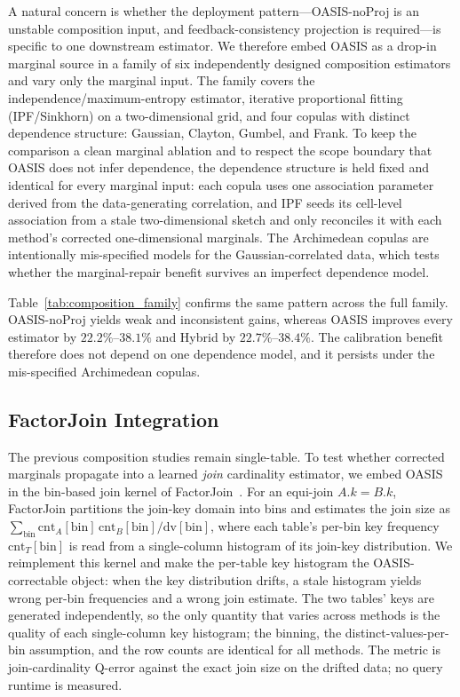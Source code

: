 \documentclass[preprint,12pt]{elsarticle}
\newcommand{\oasisUseMaxWidthResize}[1]{%
  \renewcommand{\resizebox}[3]{\adjustbox{max width=#1}{##3}}%
}
\begin{document}
A natural concern is whether the deployment pattern---OASIS-noProj is an
unstable composition input, and feedback-consistency projection is required---is
specific to one downstream estimator. We therefore embed OASIS as a drop-in
marginal source in a family of six independently designed composition estimators
and vary only the marginal input. The family covers the independence/maximum-entropy estimator,
iterative proportional fitting (IPF/Sinkhorn) on a two-dimensional grid, and
four copulas with distinct dependence structure: Gaussian, Clayton, Gumbel, and
Frank. To keep the comparison a clean marginal ablation and to respect the scope
boundary that OASIS does not infer dependence, the dependence structure is held
fixed and identical for every marginal input: each copula uses one association
parameter derived from the data-generating correlation, and IPF seeds its
cell-level association from a stale two-dimensional sketch and only reconciles it
with each method's corrected one-dimensional marginals. The Archimedean copulas
are intentionally mis-specified models for the Gaussian-correlated data, which
tests whether the marginal-repair benefit survives an imperfect dependence model.

\begingroup
\oasisUseMaxWidthResize{.96\textwidth}

\endgroup

Table~\ref{tab:composition_family} confirms the same pattern across the full
family. OASIS-noProj yields weak and inconsistent gains, whereas OASIS
improves every estimator by $22.2\%$--$38.1\%$ and Hybrid by
$22.7\%$--$38.4\%$. The calibration benefit therefore does not depend on one
dependence model, and it persists under the mis-specified Archimedean copulas.

\subsection{FactorJoin Integration}
\label{sec:factorjoin}

The previous composition studies remain single-table. To test whether corrected
marginals propagate into a learned \emph{join} cardinality estimator, we embed
OASIS in the bin-based join kernel of FactorJoin~\cite{wu2023factorjoin}. For an
equi-join $A.k = B.k$, FactorJoin partitions the join-key domain into bins and
estimates the join size as
$\sum_{\text{bin}} \mathrm{cnt}_A[\text{bin}]\,\mathrm{cnt}_B[\text{bin}]/\mathrm{dv}[\text{bin}]$,
where each table's per-bin key frequency $\mathrm{cnt}_T[\text{bin}]$ is read
from a single-column histogram of its join-key distribution. We reimplement this
kernel and make the per-table key histogram the OASIS-correctable object: when
the key distribution drifts, a stale histogram yields wrong per-bin frequencies
and a wrong join estimate. The two tables' keys are generated independently, so
the only quantity that varies across methods is the quality of each single-column
key histogram; the binning, the distinct-values-per-bin assumption, and the row
counts are identical for all methods. The metric is join-cardinality Q-error
against the exact join size on the drifted data; no query runtime is measured.
\end{document}

